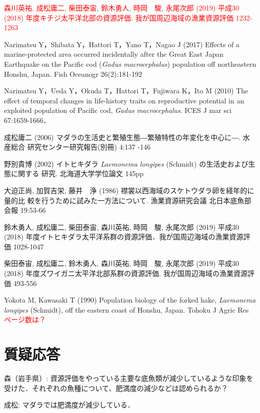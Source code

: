 \documentclass[11pt]{article} %
\begin{document}
\begin{linenumbers}
\hangindent=30pt
\noindent
\textcolor{red}{森川英祐, 成松庸二, 柴田泰宙, 鈴木勇人, 時岡　駿, 永尾次郎 (2019) 平成30 (2018) 年度キチジ太平洋北部の資源評価. 我が国周辺海域の漁業資源評価 1232-1263}

\hangindent=30pt
\noindent
Narimatsu Y，Shibata Y，Hattori T，Yano T，Nagao J (2017) Effects of a marine-protected area occurred incidentally after the Great East Japan Earthquake on the Pacific cod (\textit{Gadus macrocephalus}) population off northeastern Honshu, Japan. Fish Oceanogr 26(2):181-192

\hangindent=30pt
\noindent
Narimatsu Y，Ueda Y，Okuda T，Hattori T，Fujiwara K，Ito M (2010) The effect of temporal changes in life-history traits on reproductive potential in an exploited population of Pacific cod, \textit{Gadus macrocephalus}. ICES J mar sci 67:1659-1666．

\hangindent=30pt
\noindent
成松庸二 (2006) マダラの生活史と繁殖生態―繁殖特性の年変化を中心に―. 水産総合
研究センター研究報告(別冊) 4:137 -146

\hangindent=30pt
\noindent
野別貴博 (2002) イトヒキダラ \textit{Laemonema longipes} (Schmidt) の生活史および生態に関する
研究. 北海道大学学位論文 145pp

\hangindent=30pt
\noindent
大迫正尚, 加賀吉栄, 藤井　浄 (1986) 襟裳以西海域のスケトウダラ卵を経年的に量的比
較を行うために試みた一方法について. 漁業資源研究会議 北日本底魚部会報 19:53-66

\hangindent=30pt
\noindent
鈴木勇人, 成松庸二, 柴田泰宙, 森川英祐, 時岡　駿, 永尾次郎 (2019) 平成30 (2018) 年度イトヒキダラ太平洋系群の資源評価．我が国周辺海域の漁業資源評価 1028-1047

\hangindent=30pt
\noindent
柴田泰宙, 成松庸二, 鈴木勇人, 森川英祐, 時岡　駿, 永尾次郎 (2019) 平成30 (2018) 
年度ズワイガニ太平洋北部系群の資源評価. 我が国周辺海域の漁業資源評価 493-556

\hangindent=30pt
\noindent
Yokota M, Kawasaki T (1990) Population biology of the forked hake, \textit{Laemonema longipes} 
 (Schmidt), off the eastern coast of Honshu, Japan. Tohoku J Agric Res 
\textcolor{red}{ページ数は？}

\section{質疑応答}
森（岩手県）: 資源評価をやっている主要な底魚類が減少しているような印象を受けた．それぞれの魚種について、肥満度の減少などは認められるか？

成松: マダラでは肥満度が減少している．


\end{linenumbers}
\end{document}
